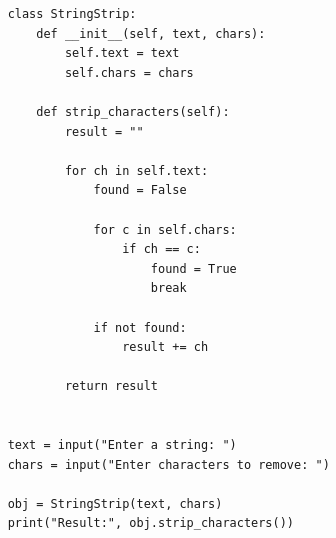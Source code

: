 \begin{verbatim}
    class StringStrip:
        def __init__(self, text, chars):
            self.text = text
            self.chars = chars
    
        def strip_characters(self):
            result = ""
    
            for ch in self.text:
                found = False
    
                for c in self.chars:
                    if ch == c:
                        found = True
                        break
    
                if not found:
                    result += ch
    
            return result
    
    
    text = input("Enter a string: ")
    chars = input("Enter characters to remove: ")
    
    obj = StringStrip(text, chars)
    print("Result:", obj.strip_characters())
\end{verbatim}